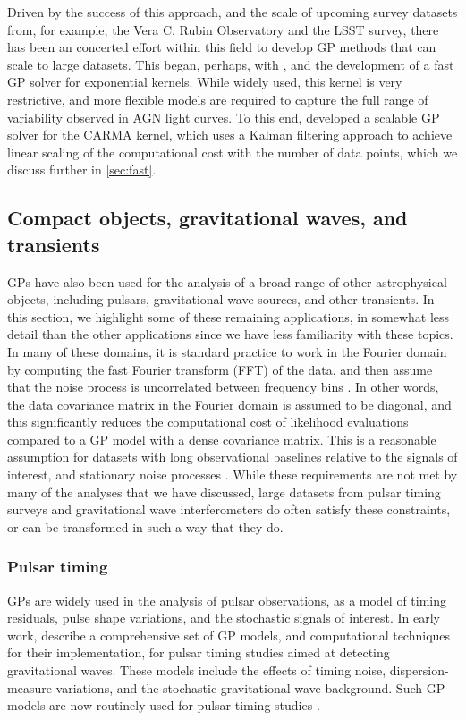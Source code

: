 \documentclass[letterpaper]{ar-1col}
\begin{document}
Driven by the success of this approach, and the scale of upcoming survey datasets from, for example, the Vera C. Rubin Observatory and the LSST survey, there has been an concerted effort within this field to develop GP methods that can scale to large datasets.
This began, perhaps, with \citet{pr95}, and the development of a fast GP solver for exponential kernels.
While widely used, this kernel is very restrictive, and more flexible models are required to capture the full range of variability observed in AGN light curves.
To this end, \citep{2014ApJ...788...33K} developed a scalable GP solver for the CARMA kernel, which uses a Kalman filtering approach to achieve linear scaling of the computational cost with the number of data points, which we discuss further in \autoref{sec:fast}.

\subsection{Compact objects, gravitational waves, and transients}

GPs have also been used for the analysis of a broad range of other astrophysical objects, including pulsars, gravitational wave sources, and other transients.
In this section, we highlight some of these remaining applications, in somewhat less detail than the other applications since we have less familiarity with these topics.
In many of these domains, it is standard practice to work in the Fourier domain by computing the fast Fourier transform (FFT) of the data, and then assume that the noise process is uncorrelated between frequency bins \citep[e.g.,][]{2017LRR....20....2R}.
In other words, the data covariance matrix in the Fourier domain is assumed to be diagonal, and this significantly reduces the computational cost of likelihood evaluations compared to a GP model with a dense covariance matrix.
This is a reasonable assumption for datasets with long observational baselines relative to the signals of interest, and stationary noise processes \citep[e.g.,][]{UNSER1984231}.
While these requirements are not met by many of the analyses that we have discussed, large datasets from pulsar timing surveys and gravitational wave interferometers do often satisfy these constraints, or can be transformed in such a way that they do.

\subsubsection{Pulsar timing} GPs are widely used in the analysis of pulsar observations, as a model of timing residuals, pulse shape variations, and the stochastic signals of interest.
In early work, \citet{2014PhRvD..90j4012V} describe a comprehensive set of GP models, and computational techniques for their implementation, for pulsar timing studies aimed at detecting gravitational waves.
These models include the effects of timing noise, dispersion-measure variations, and the stochastic gravitational wave background.
Such GP models are now routinely used for pulsar timing studies \citep[e.g.][]{2019MNRAS.489.3810P, 2020MNRAS.498.6044C, 2022MNRAS.510.4873A}.
\end{document}
